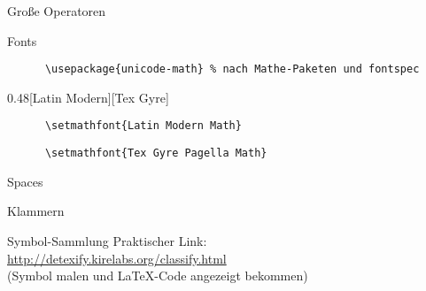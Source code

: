 \begin{frame}{Große Operatoren}
\end{frame}

\begin{frame}[fragile]{Fonts}
  \begin{Packages}
    \begin{lstlisting}
      \usepackage{unicode-math} % nach Mathe-Paketen und fontspec
    \end{lstlisting}
  \end{Packages}
  \begin{CodeExample}{0.48}[Latin Modern][Tex Gyre]
    \begin{lstlisting}
      \setmathfont{Latin Modern Math}
    \end{lstlisting}
  \CodeResult
    \begin{lstlisting}
      \setmathfont{Tex Gyre Pagella Math}
    \end{lstlisting}
  \end{CodeExample}
\end{frame}

\begin{frame}{Spaces}
\end{frame}

\begin{frame}{Klammern}
\end{frame}

\begin{frame}[fragile]{
  Symbol-Sammlung
  \hfill{}
}
  Praktischer Link: \\
  \url{http://detexify.kirelabs.org/classify.html} \\
  (Symbol malen und \LaTeX-Code angezeigt bekommen)
\end{frame}

